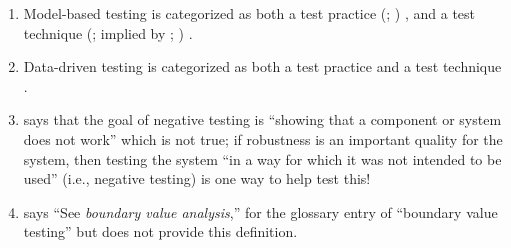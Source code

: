\begin{enumerate}
    \item %
          Model-based testing is categorized as both a test practice
          \ifnotpaper
              (\citealp[p.~22]{IEEE2022}; \citeyear[p.~viii]{IEEE2021})
          \else
              \cite[p.~22]{IEEE2022}, \cite[p.~viii]{IEEE2021}
          \fi and a test technique
          \ifnotpaper
              (\citealp[p.~4]{Kam2008}; implied by
              \citealp[p.~7]{IEEE2021}; \citeyear[p.~469]{IEEE2017})%
          \else
              \cite[p.~4]{Kam2008}%
          \fi.
    \item %
          Data-driven testing is categorized as both a test practice
          \citep[p.~22]{IEEE2022} and a test technique
          \citep[p.~43]{Kam2008}.
    \item %
           \citet[p.~46]{Kam2008} says that the goal
          of negative testing is ``showing that a component or system does not
          work'' which is not true; if robustness is an important quality for
          the system, then testing the system ``in a way for which it was not
          intended to be used'' \citepISTQB{} (i.e., negative testing) is one
          way to help test this!
    \item %
           \citet[p.~42]{Kam2008} says ``See \emph{boundary value
              analysis},'' for the glossary entry of ``boundary value testing''
          but does not provide this definition.
\end{enumerate}